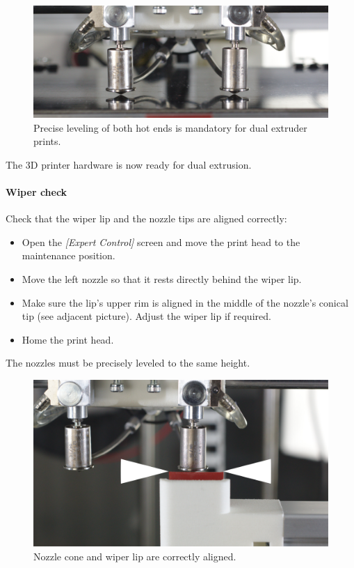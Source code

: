 \begin{figure}[H]
  \centering
  \includegraphics[width=.7\linewidth]{./img/header_dual_extrusion_leveling.jpg}
  \caption{Precise leveling of both hot ends is mandatory for dual extruder prints.}
\end{figure}

The 3D printer hardware is now ready for dual extrusion. 

\paragraph{Wiper check}

Check that the wiper lip and the nozzle tips are aligned correctly: 

\begin{itemize}
  \item Open the \emph{[Expert Control]} screen and move the print head to 
        the maintenance position.
  \item Move the left nozzle so that it rests directly behind the wiper lip.
  \item Make sure the lip's upper rim is aligned in the middle of the nozzle's conical tip 
       (see adjacent picture). Adjust the wiper lip if required.
  \item Home the print head.
\end{itemize}


\begin{info}
  The nozzles must be precisely leveled to the same height.
\end{info}

\begin{figure}[H]
  \centering
  \includegraphics[width=.7\linewidth]{./img/wiper_align.png}
  \caption{Nozzle cone and wiper lip are correctly aligned.}
\end{figure}

